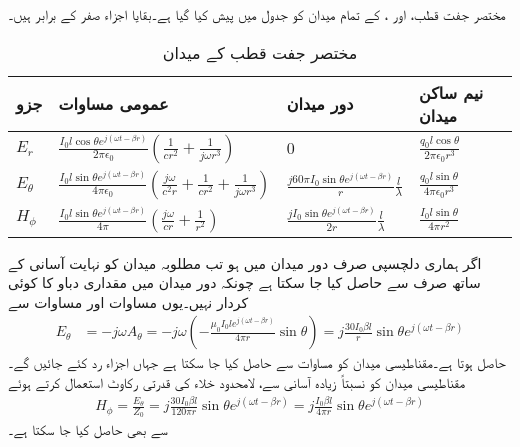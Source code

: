 مختصر جفت قطب،  اور ، کے تمام میدان کو جدول  میں پیش کیا گیا ہے۔بقایا اجزاء  صفر  کے برابر ہیں۔
\begin{table}
\caption{مختصر جفت قطب کے میدان}
\centering
\begin{tabular}{l l l l}
\hline
جزو & عمومی مساوات & دور میدان & نیم ساکن میدان\\
\hline 
\rule{0pt}{2em}
$E_r$ &$\frac{I_0 l \cos \theta e^{j(\omega t -\beta r)}}{2\pi \epsilon_0}\left(\frac{1}{c r^2}+\frac{1}{j \omega r^3} \right)$&$0$&$\frac{q_0 l \cos \theta}{2\pi \epsilon_0 r^3}$ \\[4ex]
$E_{\theta}$&$\frac{I_0 l \sin \theta e^{j(\omega t -\beta r)}}{4\pi \epsilon_0}\left(\frac{j \omega}{c^2 r}+\frac{1}{c r^2}+\frac{1}{j \omega r^3} \right)$&$ \frac{j 60 \pi I_0 \sin \theta e^{j(\omega t-\beta r)}}{r} \frac{l}{\lambda}$& $\frac{q_0 l \sin \theta }{4\pi \epsilon_0 r^3}$\\ [4ex]
$H_{\phi}$&$\frac{I_0 l \sin \theta e^{j(\omega t -\beta r)}}{4\pi} \left(\frac{j \omega}{c r}+\frac{1}{r^2} \right)$&$\frac{j I_0 \sin \theta e^{j(\omega t -\beta r)}}{2r}\frac{l}{\lambda}  $& $\frac{I_0 l \sin \theta }{4\pi r^2} $
\end{tabular}
\label{جدول_اینٹینا_مختصر_جفت_قطب}
\end{table}

اگر ہماری دلچسپی صرف دور میدان میں ہو تب مطلوبہ میدان کو نہایت آسانی کے ساتھ صرف  سے حاصل کیا جا سکتا ہے چونکہ دور میدان میں مقداری دباو  کا کوئی کردار نہیں۔یوں مساوات  اور مساوات  سے
\begin{align}
E_{\theta}&=-j \omega A_{\theta}=-j \omega \left(-\frac{ \mu_0 I_0 l e^{j(\omega t -\beta r)}}{4\pi r} \sin \theta \right)=j \frac{30 I_0 \beta l}{r} \sin \theta e^{j(\omega t-\beta r)}
\end{align}
حاصل ہوتا ہے۔مقناطیسی میدان  کو مساوات  سے حاصل کیا جا سکتا ہے  جہاں  اجزاء رد کئے جائیں گے۔مقناطیسی میدان  کو نسبتاً زیادہ آسانی سے، لامحدود خلاء کی قدرتی
 رکاوٹ  استعمال کرتے ہوئے
\begin{align}
H_{\phi}=\frac{E_{\theta}}{Z_0}=j \frac{30 I_0 \beta l}{120 \pi r} \sin \theta e^{j(\omega t-\beta r)}=j \frac{ I_0 \beta l}{4 \pi r} \sin \theta e^{j(\omega t-\beta r)}
\end{align}
سے بھی  حاصل کیا جا سکتا ہے۔

